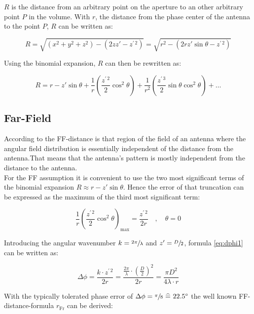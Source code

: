 $R$ is the distance from an arbitrary point on the aperture to an other arbitrary point $P$ in the volume. With $r$, the distance from the phase center of the antenna to the point $P$, $R$ can be written as: \cite{balanis}

\begin{equation}
R = \sqrt{\left(x^2+y^2+z^2\right)-\left(2zz'-z^{\prime\, 2}\right)}=\sqrt{r^2-\left(2rz'\sin \theta -z^{\prime\, 2}\right)}
\end{equation}

Using the binomial expansion, $R$ can then be rewritten as:

\begin{equation}
R = r - z'\sin\theta + \frac{1}{r}\left(\frac{z^{\prime\, 2}}{2}\cos ^2 \theta\right) + \frac{1}{r^2}\left(\frac{z^{\prime\, 3}}{2}\sin\theta\cos^2\theta\right) + \dots
\end{equation}

\subsection{Far-Field}

According to \cite{balanis} the \ac{FF}-distance is \glqq that region of the field of an antenna where the angular field distribution is essentially independent of the distance from the antenna.\grqq{ }That means that the antenna's pattern is mostly independent from the distance to the antenna.\\
For the \ac{FF} assumption it is convenient to use the two most significant terms of the binomial expansion $R\approx r - z'\sin\theta$. Hence the error of that truncation can be expressed as the maximum of the third most significant term:

\begin{equation}
\frac{1}{r}\left(\frac{z^{\prime\, 2}}{2}\cos ^2 \theta\right)_\text{max} = \frac{z^{\prime\, 2}}{2r} \quad , \quad \theta = 0
\label{eq:dphi1}
\end{equation}

Introducing the angular wavenumber $k=\sfrac{2\pi}{\lambda}$ and $z'=\sfrac{D}{2}$, formula \ref{eq:dphi1} can be written as:


\begin{equation}
\Delta\phi = \frac{k\cdot z^{\prime\, 2}}{2r} =\frac{\frac{2\pi}{\lambda}\cdot \left(\frac{D}{2}\right)^2}{2r} = \frac{\pi D^2}{4\lambda\cdot r}
\end{equation}

With the typically tolerated phase error of $\Delta\phi = \sfrac{\pi}{8} \ \widehat{=}\  22.5^\circ$ the well known \ac{FF}-distance-formula $r_{\text{Fr}}$ can be derived:

